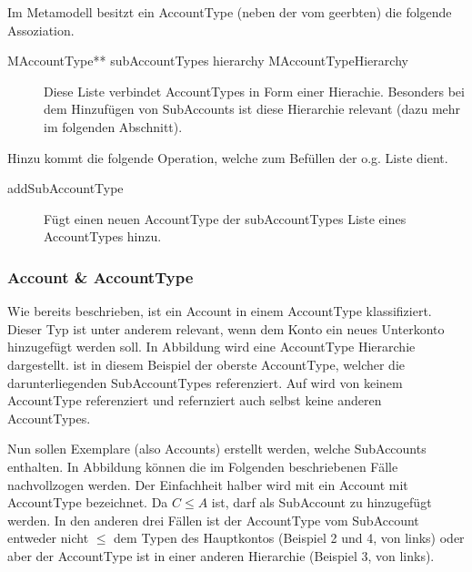 Im Metamodell besitzt ein AccountType (neben der vom  geerbten) die folgende Assoziation.
\begin{description}
	\item[MAccountType** subAccountTypes hierarchy MAccountTypeHierarchy] Diese Liste verbindet AccountTypes in Form einer Hierachie. Besonders bei dem Hinzufügen von SubAccounts ist diese Hierarchie relevant (dazu mehr im folgenden Abschnitt).
\end{description}

Hinzu kommt die folgende Operation, welche zum Befüllen der o.g. Liste dient.
\begin{description}
	\item[addSubAccountType] Fügt einen neuen AccountType der subAccountTypes Liste eines AccountTypes hinzu.
\end{description}


\subsubsection{Account \& AccountType}
Wie bereits beschrieben, ist ein Account in einem AccountType klassifiziert. Dieser Typ ist unter anderem relevant, wenn dem Konto ein neues Unterkonto hinzugefügt werden soll.  
In Abbildung  wird eine AccountType Hierarchie dargestellt.  ist in diesem Beispiel der oberste AccountType, welcher die darunterliegenden SubAccountTypes referenziert. 
Auf  wird von keinem AccountType referenziert und refernziert auch selbst keine anderen AccountTypes.  


Nun sollen Exemplare (also Accounts) erstellt werden, welche SubAccounts enthalten. In Abbildung  können die im Folgenden beschriebenen Fälle nachvollzogen werden.
Der Einfachheit halber wird mit  ein Account  mit AccountType  bezeichnet. Da $C \leq A$ ist, darf  als SubAccount zu  hinzugefügt werden.
In den anderen drei Fällen ist der AccountType vom SubAccount entweder nicht $\leq$ dem Typen des Hauptkontos (Beispiel 2 und 4, von links) oder aber der AccountType ist in einer anderen Hierarchie (Beispiel 3, von links).


